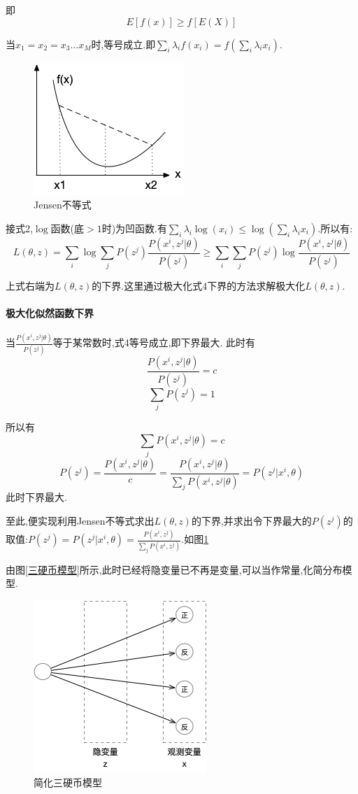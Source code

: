 \documentclass{ctexrep}
\begin{document}
即$$E[f(x)] \geq f[E(X)]$$

当$x_1=x_2=x_3...x_M$时,等号成立.即$\sum\limits_i{\lambda_if(x_i)}=f(\sum\limits_i \lambda_ix_i)$.


\begin{figure}[hbt]
	\centering
	\includegraphics[width=.3\linewidth]{凸函数.png}
	\caption{Jensen不等式}
\end{figure}

接式2,$\log$函数(底$>1$时)为凹函数.有$\sum\limits_i{\lambda_i\log(x_i)}\leq \log(\sum\limits_i \lambda_ix_i)$.所以有:
\begin{equation}
	L(\theta,z)
	=\sum\limits_i{ \log \sum\limits_j{ P(z^j)\frac{P(x^i,z^j|\theta)}{P(z^j)}}}
	\geq \sum\limits_i{ \sum\limits_j{ P(z^j)\log{\frac{P(x^i,z^j|\theta)}{P(z^j)}}}}
\label{ltz_j}
\end{equation}

上式右端为$L(\theta,z)$的下界.这里通过极大化式4下界的方法求解极大化$L(\theta,z)$.

\paragraph{极大化似然函数下界}
当$\frac{P(x^i,z^j|\theta)}{P(z^j)}$等于某常数时,式4等号成立,即下界最大.
此时有
$$\frac{P(x^i,z^j|\theta)}{P(z^j)} = c$$
$$\sum\limits_j P(z^j) = 1$$

所以有$$\sum\limits_j P(x^i,z^j|\theta)=c$$
\begin{equation}
	P(z^j)=\frac{P(x^i,z^j|\theta)}{c}=\frac{P(x^i,z^j|\theta)}{\sum\limits_j P(x^i,z^j|\theta)}=P(z^j|x^i,\theta)
\label{pz}
\end{equation}
此时下界最大.

至此,便实现利用Jensen不等式求出$L(\theta,z)$的下界,并求出令下界最大的$P(z^j)$的取值:$P(z^j)=P(z^j|x^i,\theta)=\frac{P(x^i,z^j)}{\sum\limits_j{P(x^i,z^j)}}$.如图\ref{简化三硬币模型}

由图\ref{三硬币模型}所示,此时已经将隐变量已不再是变量,可以当作常量,化简分布模型.

\begin{figure}[hbt]
	\centering
  	\includegraphics[width=0.4\linewidth]{三硬币化简示意图.png}
  	\caption{简化三硬币模型}
  	\label{简化三硬币模型}
\end{figure}
\end{document}
